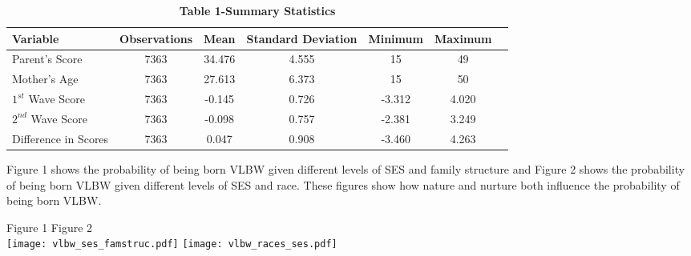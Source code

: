 \documentclass{article}
\begin{document}

\begin{table}[H]
\centering 
\setlength\extrarowheight{-6pt}

\begin{threeparttable}

	\singlespace
	
	  \caption*{\textbf{Table 1-Summary Statistics}}
	  
		\begin{tabular}{l*{6}{c}}
\hline\hline
Variable & Observations & Mean & Standard Deviation & Minimum & Maximum \\
\hline 
Parent's Score & 7363 & 34.476 & 4.555 & 15 & 49 \\
Mother's Age & 7363 & 27.613 & 6.373 & 15 & 50 \\
$1^{st}$ Wave Score & 7363 & -0.145 & 0.726 & -3.312 & 4.020 \\
$2^{nd}$ Wave Score& 7363 & -0.098 & 0.757 & -2.381 & 3.249 \\
Difference in Scores & 7363 & 0.047 & 0.908 & -3.460 & 4.263 \\

\hline 

		\end{tabular}

\end{threeparttable}

\end{table}

Figure 1 shows the probability of being born VLBW given different levels of SES and family structure and Figure 2 shows the probability of being born VLBW given different levels of SES and race. These figures show how nature and nurture both influence the probability of being born VLBW.

\quad \quad \quad \quad \quad \quad \quad \quad \quad Figure 1 \quad \quad \quad \quad \quad \quad \quad \quad \quad \quad \quad \quad \quad \quad \quad \quad \quad \quad \quad Figure 2 \\

\texttt{[image: vlbw\_ses\_famstruc.pdf]}
\texttt{[image: vlbw\_races\_ses.pdf]} 
\end{document}
